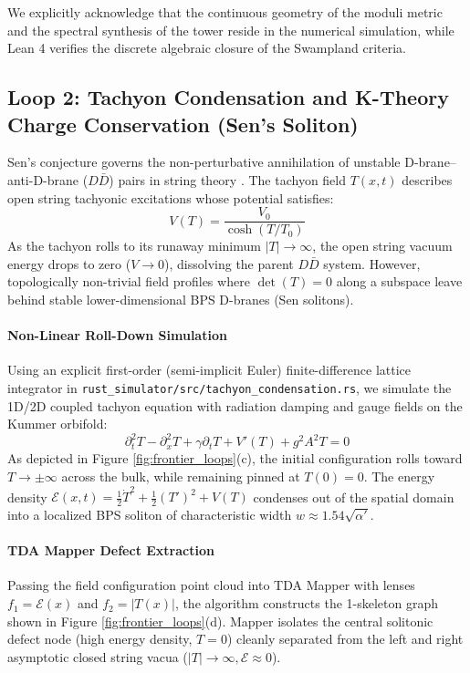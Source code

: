 \documentclass[11pt,a4paper]{article}
\newcommand{\numreconcile}[2]{#1}
\begin{document}
We explicitly acknowledge that the continuous geometry of the moduli metric and the spectral synthesis of the tower reside in the numerical simulation, while Lean 4 verifies the discrete algebraic closure of the Swampland criteria.

\subsection{Loop 2: Tachyon Condensation and K-Theory Charge Conservation (Sen's Soliton)}
Sen's conjecture governs the non-perturbative annihilation of unstable D-brane–anti-D-brane ($D\bar{D}$) pairs in string theory \cite{sen1998, witten1998k}. The tachyon field $T(x, t)$ describes open string tachyonic excitations whose potential satisfies:
\begin{equation}
V(T) = \frac{V_0}{\cosh(T / T_0)}
\end{equation}
As the tachyon rolls to its runaway minimum $|T| \to \infty$, the open string vacuum energy drops to zero ($V \to 0$), dissolving the parent $D\bar{D}$ system. However, topologically non-trivial field profiles where $\det(T) = 0$ along a subspace leave behind stable lower-dimensional BPS D-branes (Sen solitons).

\paragraph{Non-Linear Roll-Down Simulation}
Using an explicit first-order (semi-implicit Euler) finite-difference lattice integrator in \texttt{rust\_simulator/src/tachyon\_condensation.rs}, we simulate the 1D/2D coupled tachyon equation with radiation damping and gauge fields on the Kummer orbifold:
\begin{equation}
\partial_t^2 T - \partial_x^2 T + \gamma \partial_t T + V'(T) + g^2 A^2 T = 0
\end{equation}
As depicted in Figure \ref{fig:frontier_loops}(c), the initial configuration rolls toward $T \to \pm \infty$ across the bulk, while remaining pinned at $T(0) = 0$. The energy density $\mathcal{E}(x, t) = \frac{1}{2}\dot{T}^2 + \frac{1}{2}(T')^2 + V(T)$ condenses out of the spatial domain into a localized BPS soliton of characteristic width $w \approx \numreconcile{1.54}{Sen soliton width}\sqrt{\alpha'}$.

\paragraph{TDA Mapper Defect Extraction}
Passing the field configuration point cloud into TDA Mapper with lenses $f_1 = \mathcal{E}(x)$ and $f_2 = |T(x)|$, the algorithm constructs the 1-skeleton graph shown in Figure \ref{fig:frontier_loops}(d). Mapper isolates the central solitonic defect node (high energy density, $T=0$) cleanly separated from the left and right asymptotic closed string vacua ($|T| \to \infty, \mathcal{E} \approx 0$).
\end{document}
